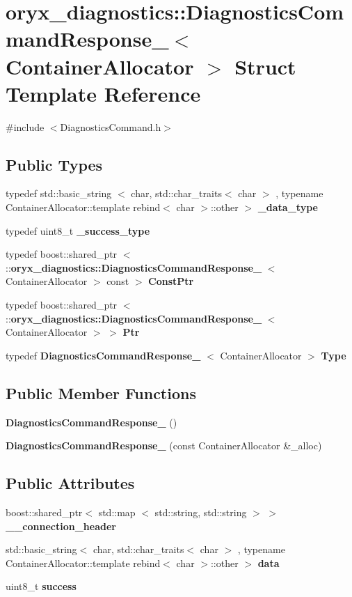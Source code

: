 \section{oryx\-\_\-diagnostics\-:\-:\-Diagnostics\-Command\-Response\-\_\-$<$ \-Container\-Allocator $>$ \-Struct \-Template \-Reference}
\label{structoryx__diagnostics_1_1DiagnosticsCommandResponse__}


{\ttfamily \#include $<$\-Diagnostics\-Command.\-h$>$}

\subsection*{\-Public \-Types}
\begin{DoxyCompactItemize}
\item 
typedef std\-::basic\-\_\-string\*
$<$ char, std\-::char\-\_\-traits$<$ char $>$\*
, typename \*
\-Container\-Allocator\-::template \*
rebind$<$ char $>$\-::other $>$ {\bf \-\_\-data\-\_\-type}
\item 
typedef uint8\-\_\-t {\bf \-\_\-success\-\_\-type}
\item 
typedef boost\-::shared\-\_\-ptr\*
$<$ \-::{\bf oryx\-\_\-diagnostics\-::\-Diagnostics\-Command\-Response\-\_\-}\*
$<$ \-Container\-Allocator $>$ const  $>$ {\bf \-Const\-Ptr}
\item 
typedef boost\-::shared\-\_\-ptr\*
$<$ \-::{\bf oryx\-\_\-diagnostics\-::\-Diagnostics\-Command\-Response\-\_\-}\*
$<$ \-Container\-Allocator $>$ $>$ {\bf \-Ptr}
\item 
typedef \*
{\bf \-Diagnostics\-Command\-Response\-\_\-}\*
$<$ \-Container\-Allocator $>$ {\bf \-Type}
\end{DoxyCompactItemize}
\subsection*{\-Public \-Member \-Functions}
\begin{DoxyCompactItemize}
\item 
{\bf \-Diagnostics\-Command\-Response\-\_\-} ()
\item 
{\bf \-Diagnostics\-Command\-Response\-\_\-} (const \-Container\-Allocator \&\-\_\-alloc)
\end{DoxyCompactItemize}
\subsection*{\-Public \-Attributes}
\begin{DoxyCompactItemize}
\item 
boost\-::shared\-\_\-ptr$<$ std\-::map\*
$<$ std\-::string, std\-::string $>$ $>$ {\bf \-\_\-\-\_\-connection\-\_\-header}
\item 
std\-::basic\-\_\-string$<$ char, \*
std\-::char\-\_\-traits$<$ char $>$\*
, typename \*
\-Container\-Allocator\-::template \*
rebind$<$ char $>$\-::other $>$ {\bf data}
\item 
uint8\-\_\-t {\bf success}
\end{DoxyCompactItemize}


